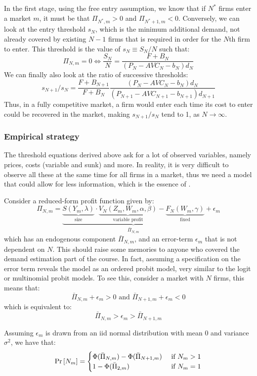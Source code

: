 In the first stage, using the free entry assumption, we know that if $N^*$ firms enter a market $m$, it must be that $\Pi_{N^*,m} > 0$ and $\Pi_{N^*+1,m} < 0$. Conversely, we can look at the entry threshold $s_N$, which is the minimum additional demand, not already covered by existing $N-1$ firms that is required in order for the $N$th firm to enter. This threshold is the value of $s_N \equiv S_N/N$ such that: $$\Pi_{N,m} = 0 \Leftrightarrow \frac{S_N}{N} = \frac{F + B_N}{(P_N - AVC_N - b_N)d_N} $$ We can finally also look at the ratio of successive thresholds: $$s_{N+1}/s_N = \frac{F + B_{N+1}}{F + B_N}\frac{(P_N - AVC_{N} - b_N)d_N}{(P_{N+1} - AVC_{N+1} - b_{N+1})d_{N+1}} $$ Thus, in a fully competitive market, a firm would enter each time its cost to enter could be recovered in the market, making $s_{N+1}/s_N$ tend to 1, as $N\to\infty$.

\subsubsection{Empirical strategy}

The threshold equations derived above ask for a lot of observed variables, namely prices, costs (variable and sunk) and more. In reality, it is very difficult to observe all these at the same time for all firms in a market, thus we need a model that could allow for less information, which is the essence of \cite{br_91}.

Consider a reduced-form profit function given by: $$\Pi_{N,m} = \underbrace{\underbrace{S(Y_m, \lambda)}_{\text{size}} \cdot \underbrace{V_{N}(Z_{m}, W_{m}, \alpha, \beta)}_{\text{variable profit}} - \underbrace{F_N(W_{m}, \gamma)}_{\text{fixed}}}_{\bar\Pi_{N,m}} + \epsilon_m $$ which has an endogenous component $\bar\Pi_{N,m}$, and an error-term $\epsilon_m$ that is not dependent on $N$. This should raise some memories to anyone who covered the demand estimation part of the course. In fact, assuming a specification on the error term reveals the model as an ordered probit model, very similar to the logit or multinomial probit models. To see this, consider a market with $N$ firms, this means that: $$ \bar\Pi_{N,m} + \epsilon_m > 0 \text{ and } \bar\Pi_{N+1,m} + \epsilon_m < 0 $$ which is equivalent to: $$ \bar\Pi_{N,m} > \epsilon_m > \bar\Pi_{N+1,m} $$

Assuming $\epsilon_m$ is drawn from an iid normal distribution with mean 0 and variance $\sigma^2$, we have that: $$\operatorname{Pr}\left[N_m\right] = \begin{cases} \Phi(\bar\Pi_{N,m}) - \Phi(\bar\Pi_{N+1,m}) & \text{ if }N_m > 1 \\
1 - \Phi(\bar\Pi_{2,m}) & \text{ if }N_m = 1
\end{cases} $$

